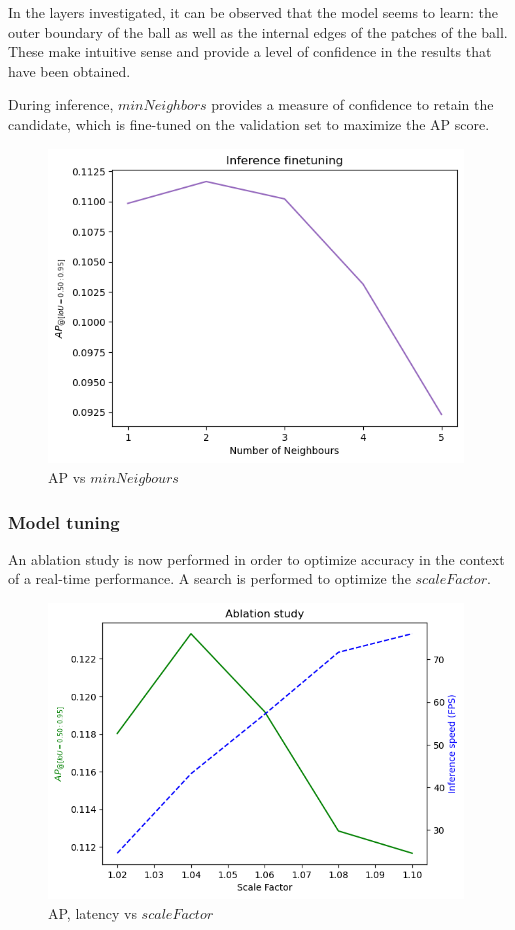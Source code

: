 \documentclass[a4paper,twoside,12pt]{report}
\begin{document}
In the layers investigated, it can be observed that the model seems to learn: the outer boundary of the ball as well as the internal edges of the patches of the ball. These make intuitive sense and provide a level of confidence in the results that have been obtained.

During inference, $minNeighbors$ provides a measure of confidence to retain the candidate, which is fine-tuned on the validation set to maximize the AP score.

\begin{figure}[h!]
\begin{center}
\includegraphics[width=11cm]{images/vj_tune.png}
\caption{AP vs $minNeigbours$}
\label{fig:vjneighbors}
\end{center}
\end{figure}

\subsubsection{Model tuning}

An ablation study is now performed in order to optimize accuracy in the context of a real-time performance. A search is performed to optimize the $scaleFactor$.

\begin{figure}[h!]
\begin{center}
\includegraphics[width=11cm]{images/vj_ablation.png}
\caption{AP, latency vs $scaleFactor$}
\label{fig:vjspeeds}
\end{center}
\end{figure}
\end{document}
